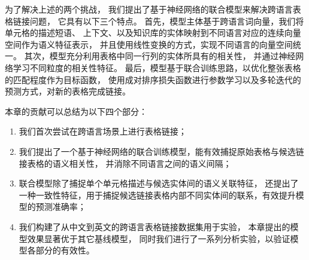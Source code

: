 
为了解决上述的两个挑战，
我们提出了基于神经网络的联合模型来解决跨语言表格链接问题，
它具有以下三个特点。
首先，模型主体基于跨语言词向量，我们将单元格的描述短语、%
上下文、以及知识库的实体映射到不同语言对应的连续向量空间作为语义特征表示，
并且使用线性变换的方式，实现不同语言的向量空间统一。
其次，模型充分利用表格中同一行列的实体所具有的相关性，
并通过神经网络学习不同粒度的相关性特征。
最后，模型基于联合训练思路，以优化整张表格的匹配程度作为目标函数，
使用成对排序损失函数进行参数学习以及多轮迭代的预测方式，对新的表格完成链接。

%

本章的贡献可以总结为以下四个部分：
\begin{enumerate}
\item{我们首次尝试在跨语言场景上进行表格链接；}
\item{我们提出了一个基于神经网络的联合训练模型，能有效捕捉原始表格与候选链接表格的语义相关性，
并消除不同语言之间的语义间隔；}%
\item{联合模型除了捕捉单个单元格描述与候选实体间的语义关联特征，
还提出了一种一致性特征，用于捕捉候选链接表格内部不同实体间的联系，有效提升模型的预测准确率；}
\item{我们构建了从中文到英文的跨语言表格链接数据集用于实验，
本章提出的模型效果显著优于其它基线模型，
同时我们进行了一系列分析实验，以验证模型各部分的有效性。}
\end{enumerate}

